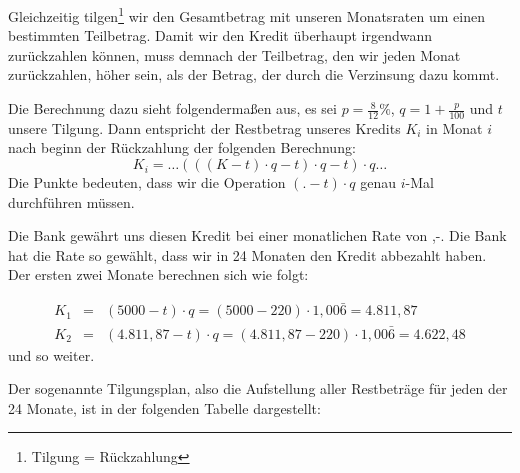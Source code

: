 Gleichzeitig tilgen\footnote{Tilgung = Rückzahlung} wir den Gesamtbetrag mit unseren Monatsraten um einen bestimmten Teilbetrag. Damit wir den Kredit überhaupt irgendwann zurückzahlen können, muss demnach der Teilbetrag, den wir jeden Monat zurückzahlen, höher sein, als der Betrag, der durch die Verzinsung dazu kommt.

Die Berechnung dazu sieht folgendermaßen aus, es sei $p=\frac{8}{12}\% $, $q = 1+\frac{p}{100}$ und $t$ unsere Tilgung. Dann entspricht der Restbetrag unseres Kredits $K_i$ in Monat $i$ nach beginn der Rückzahlung der folgenden Berechnung:
\[
K_i = \dots (((K-t)\cdot q-t)\cdot q-t)\cdot q \dots
\]
Die Punkte bedeuten, dass wir die Operation $(. -t)\cdot q$ genau $i$-Mal durchführen müssen.

Die Bank gewährt uns diesen Kredit bei einer monatlichen Rate von ,-. Die Bank hat die Rate so gewählt, dass wir in 24 Monaten den Kredit abbezahlt haben. Der ersten zwei Monate berechnen sich wie folgt:

\begin{eqnarray*}
K_1 &=& (5000-t)\cdot q = (5000 -220)\cdot 1,00\bar{6} = 4.811,87 \\
K_2 &=& (4.811,87 -t) \cdot q = (4.811,87 - 220)\cdot 1,00\bar{6} = 4.622,48
\end{eqnarray*}
und so weiter. 

Der sogenannte Tilgungsplan, also die Aufstellung aller Restbeträge für jeden der 24 Monate, ist in der folgenden Tabelle dargestellt:

